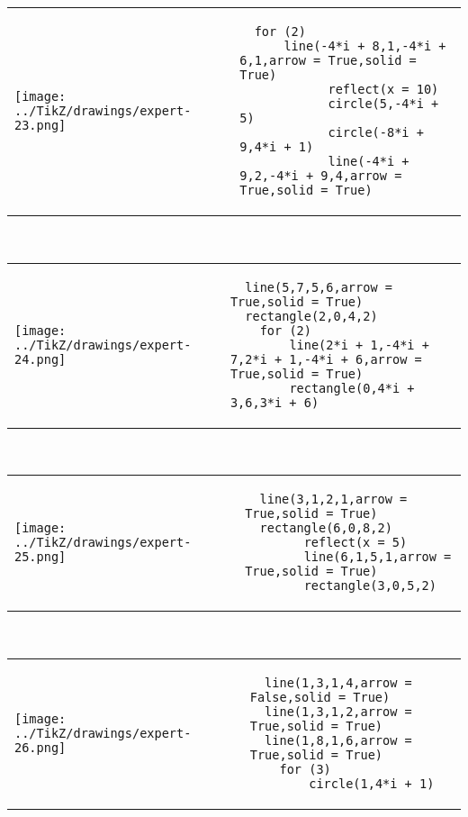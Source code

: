             \begin{tabular}{ll}
    \texttt{[image: ../TikZ/drawings/expert-23.png]}&
    
        \begin{minipage}{10cm}
        \begin{verbatim}
  for (2)
      line(-4*i + 8,1,-4*i + 6,1,arrow = True,solid = True)
            reflect(x = 10)
            circle(5,-4*i + 5)
            circle(-8*i + 9,4*i + 1)
            line(-4*i + 9,2,-4*i + 9,4,arrow = True,solid = True)
        \end{verbatim}
\end{minipage}

    \end{tabular}        
            \\

            \begin{tabular}{ll}
    \texttt{[image: ../TikZ/drawings/expert-24.png]}&
    
        \begin{minipage}{10cm}
        \begin{verbatim}
  line(5,7,5,6,arrow = True,solid = True)
  rectangle(2,0,4,2)
    for (2)
        line(2*i + 1,-4*i + 7,2*i + 1,-4*i + 6,arrow = True,solid = True)
        rectangle(0,4*i + 3,6,3*i + 6)
        \end{verbatim}
\end{minipage}

    \end{tabular}        
            \\

            \begin{tabular}{ll}
    \texttt{[image: ../TikZ/drawings/expert-25.png]}&
    
        \begin{minipage}{10cm}
        \begin{verbatim}
  line(3,1,2,1,arrow = True,solid = True)
  rectangle(6,0,8,2)
        reflect(x = 5)
        line(6,1,5,1,arrow = True,solid = True)
        rectangle(3,0,5,2)
        \end{verbatim}
\end{minipage}

    \end{tabular}        
            \\

            \begin{tabular}{ll}
    \texttt{[image: ../TikZ/drawings/expert-26.png]}&
    
        \begin{minipage}{10cm}
        \begin{verbatim}
  line(1,3,1,4,arrow = False,solid = True)
  line(1,3,1,2,arrow = True,solid = True)
  line(1,8,1,6,arrow = True,solid = True)
    for (3)
        circle(1,4*i + 1)
        \end{verbatim}
\end{minipage}

    \end{tabular}        
            \\

